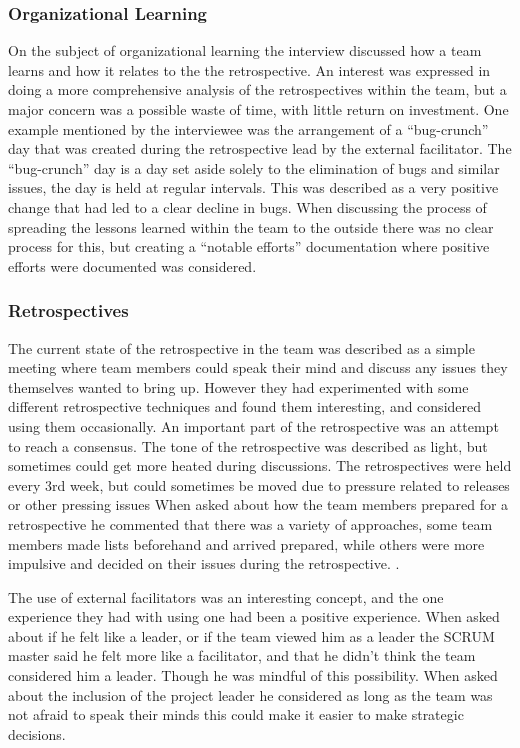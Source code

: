 \subsubsection{Organizational Learning}
On the subject of organizational learning the interview discussed how a team learns and how it relates to the the retrospective. An interest was expressed in doing a more comprehensive analysis of the retrospectives within the team, but a major concern was a possible waste of time, with little return on investment. One example mentioned by the interviewee was the arrangement of a ``bug-crunch'' day that was created during the retrospective lead by the external facilitator. The ``bug-crunch'' day is a day set aside solely to the elimination of bugs and similar issues, the day is held at regular intervals. This was described as a very positive change that had led to a clear decline in bugs. When discussing the process of spreading the lessons learned within the team to the outside there was no clear process for this, but creating a ``notable efforts'' documentation where positive efforts were documented was considered. 

\subsubsection{Retrospectives}
The current state of the retrospective in the team was described as a simple meeting where team members could speak their mind and discuss any issues they themselves wanted to bring up. However they had experimented with some different retrospective techniques and found them interesting, and considered using them occasionally. An important part of the retrospective was an attempt to reach a consensus. The tone of the retrospective was described as light, but sometimes could get more heated during discussions. The retrospectives were held every 3rd week, but could sometimes be moved due to pressure related to releases or other pressing issues
When asked about how the team members prepared for a retrospective he commented that there was a variety of approaches, some team members made lists beforehand and arrived prepared, while others were more impulsive and decided on their issues during the retrospective. . 

The use of external facilitators was an interesting concept, and the one experience they had with using one had been a positive experience. When asked about if he felt like a leader, or if the team viewed him as a leader the SCRUM master said he felt more like a facilitator, and that he didn't think the team considered him a leader. Though he was mindful of this possibility. When asked about the inclusion of the project leader he considered as long as the team was not afraid to speak their minds this could make it easier to make strategic decisions.

